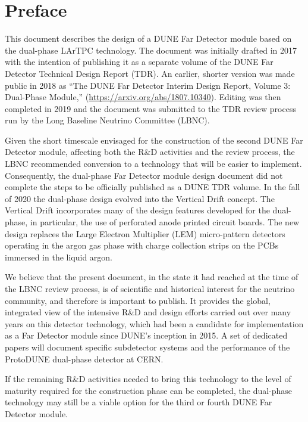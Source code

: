 \cleardoublepage
\chapter*{Preface}

This document describes the design of a DUNE Far Detector module based on the dual-phase LArTPC technology. The document was initially drafted in 2017 with the intention of publishing it as a separate volume of the DUNE Far Detector Technical Design Report (TDR). An earlier, shorter version was made public in 2018 as ``The DUNE Far Detector Interim Design Report, Volume 3: Dual-Phase Module,'' (\url{https://arxiv.org/abs/1807.10340}). Editing was then completed in 2019 and the document was submitted to the TDR review process run by the Long Baseline Neutrino Committee (LBNC). 

Given the short timescale envisaged for the construction of the second DUNE Far Detector module, affecting both the R\&D activities and the review process, the LBNC recommended conversion to a technology that will be easier to implement. Consequently, the dual-phase Far Detector module design document did not complete the steps to be officially published as a DUNE TDR volume.
In the fall of 2020 the dual-phase design evolved into the Vertical Drift concept. The Vertical Drift incorporates many of the design features developed for the dual-phase, in particular, the use of perforated anode printed circuit boards. The new design replaces the Large Electron Multiplier (LEM) micro-pattern detectors operating in the argon gas phase with charge collection strips on the PCBs immersed in the liquid argon. 

We believe that the present document, in the state it had reached at the time of the LBNC review process, is of scientific and historical interest for the neutrino community, and therefore is important to publish. It provides the global, integrated view of the intensive R\&D and design efforts carried out over many years on this detector technology, which had been a candidate for implementation as a Far Detector module since DUNE's inception in 2015. A set of dedicated papers will document specific subdetector systems and the performance of the ProtoDUNE dual-phase detector at CERN. 

If the remaining R\&D activities needed to bring this technology to the level of maturity required for the construction phase can be completed, the dual-phase technology may still be a viable option for the third or fourth DUNE Far Detector module.
